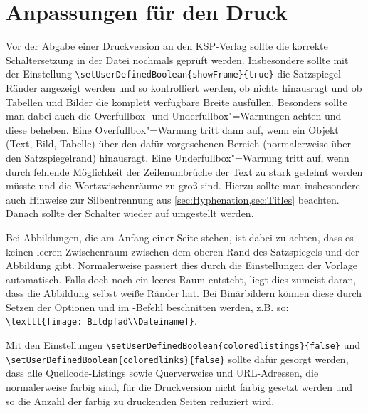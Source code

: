 \section[Anpassungen für den Druck]{Anpassungen für den Druck}%
%
\label{sec:Druckanpassungen}
%
Vor der Abgabe einer Druckversion an den KSP-Verlag sollte die korrekte Schaltersetzung in der Datei  nochmals geprüft werden.
Insbesondere sollte mit der Einstellung
\lstinline|\setUserDefinedBoolean{showFrame}{true}|
die Satzspiegel-Ränder angezeigt werden und so kontrolliert werden,
ob nichts hinausragt und ob Tabellen und Bilder die komplett verfügbare Breite ausfüllen.
Besonders sollte man dabei auch die Overfullbox- und Underfullbox"=Warnungen achten und diese beheben.
Eine Overfullbox"=Warnung tritt dann auf, wenn ein Objekt (Text, Bild, Tabelle)
über den dafür vorgesehenen Bereich (normalerweise über den Satzspiegelrand) hinausragt.
Eine Underfullbox"=Warnung tritt auf, wenn durch fehlende Möglichkeit der Zeilenumbrüche der Text zu stark gedehnt werden müsste und die Wortzwischenräume zu groß sind.
Hierzu sollte man insbesondere auch Hinweise zur Silbentrennung aus
\cref{sec:Hyphenation,sec:Titles} beachten.
Danach sollte der Schalter wieder auf  umgestellt werden.

Bei Abbildungen, die am Anfang einer Seite stehen, ist dabei zu achten,
dass es keinen leeren Zwischenraum zwischen dem oberen Rand des Satzspiegels und der Abbildung gibt.
Normalerweise passiert dies durch die Einstellungen der Vorlage automatisch.
Falls doch noch ein leeres Raum entsteht, liegt dies zumeist daran, dass die Abbildung selbst weiße Ränder hat.
Bei Binärbildern können diese durch Setzen der Optionen
 und 
im -Befehl beschnitten werden, z.B. so:
\lstinline|\texttt{[image: Bildpfad\\Dateiname]}|.

Mit den Einstellungen 
\lstinline|\setUserDefinedBoolean{coloredlistings}{false}| und 
\lstinline|\setUserDefinedBoolean{coloredlinks}{false}|
sollte dafür gesorgt werden, dass alle Quellcode-Listings sowie Querverweise und URL-Adressen,
die normalerweise farbig sind, für die Druckversion nicht farbig gesetzt werden
und so die Anzahl der farbig zu druckenden Seiten reduziert wird.

